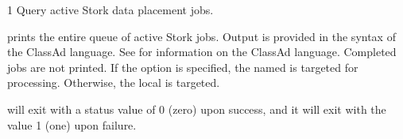 \begin{ManPage}{\label{man-stork-q}}{1}
{Query active Stork data placement jobs.}
\Synopsis {}
\ToolArgsBase

\Storkname



\Description 

 prints the entire queue of active Stork jobs.
Output is provided in the syntax of the ClassAd language.
See  for information
on the ClassAd language.  Completed jobs are not printed.
If the  option is specified, the named  is targeted
for processing.  Otherwise, the local  is targeted.


\begin{Options}
	\ToolArgsBaseDesc
	\StorknameDesc
\end{Options}

\ExitStatus

 will exit with a status value of 0 (zero) upon success,
and it will exit with the value 1 (one) upon failure.

\end{ManPage}
